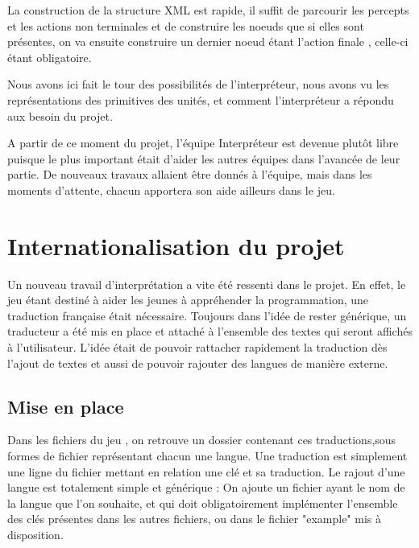 \documentclass{report}
\begin{document}
La construction de la structure XML est rapide, il suffit de parcourir les percepts et les actions non terminales et de construire les noeuds que si elles sont présentes, on va ensuite construire un dernier noeud étant l’action finale , celle-ci étant obligatoire.

Nous avons ici fait le tour des possibilités de l’interpréteur, nous avons vu les représentations des primitives des unités, et comment l’interpréteur a répondu aux besoin du projet. 

A partir de ce moment du projet, l’équipe Interpréteur est devenue plutôt libre puisque le plus important était d’aider les autres équipes dans l’avancée de leur partie. De nouveaux travaux allaient être donnés à l’équipe, mais dans les moments d’attente, chacun apportera son aide ailleurs dans le jeu.

\newpage
\paragraph{}

\section{Internationalisation du projet}

Un nouveau travail d'interprétation a vite été ressenti dans le projet. En effet, le jeu étant destiné à aider les jeunes à appréhender la programmation, une traduction française était nécessaire.
Toujours dans l'idée de rester générique, un traducteur a été mis en place et attaché à l'ensemble des textes qui seront affichés à l'utilisateur. L’idée était de pouvoir rattacher rapidement la traduction dès l’ajout de textes et aussi de pouvoir rajouter des langues de manière externe.

\paragraph{}
\subsection{Mise en place}

Dans les fichiers du jeu , on retrouve un dossier contenant ces traductions,sous formes de fichier représentant chacun une langue.
Une traduction est simplement une ligne du fichier mettant en relation une clé et sa traduction.
Le rajout d'une langue est totalement simple et générique :
On ajoute un fichier ayant le nom de la langue que l'on souhaite, et qui doit obligatoirement implémenter l'ensemble des clés présentes dans les autres fichiers, ou dans le fichier "example" mis à disposition.
\end{document}
